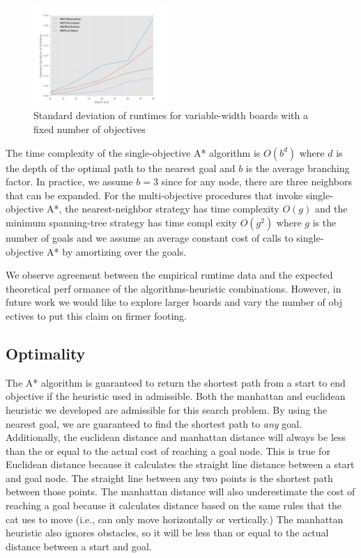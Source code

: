 \documentclass[12pt, conference, compsocconf]{IEEEtran}
\begin{document}
\begin{figure}[h!]
    \centering
    \includegraphics[width=0.45\textwidth]{variability.png}
    \caption{Standard deviation of runtimes for variable-width boards with a fixed number of objectives}
    \label{variability-fig}
\end{figure}

The time complexity of the single-objective A* algorithm is $O(b^d)$ where $d$
is the depth of the optimal path to the nearest goal and $b$ is the average
branching factor.  In practice, we assume $b = 3$ since for any node, there are
three neighbors that can be expanded.  For the multi-objective procedures that
invoke single-objective A*, the nearest-neighbor strategy has time complexity
$O(g)$ and the minimum spanning-tree strategy has time compl exity $O(g^2)$
where $g$ is the number of goals and we assume an average constant cost of
calls to single-objective A* by amortizing over the goals.

We observe agreement between the empirical runtime data and the expected
theoretical perf ormance of the algorithms-heuristic combinations.  However, in
future work we would like to explore larger boards and vary the number of obj
ectives to put this claim on firmer footing.


\subsection{Optimality}
The A* algorithm is guaranteed to return the shortest path from a start to end
objective if the heuristic used in admissible.  Both the manhattan and
euclidean heuristic we developed are admissible for this search problem.  By
using the nearest goal, we are guaranteed to find the shortest path to {\em
any} goal.  Additionally, the euclidean distance and manhattan distance will
always be less than the or equal to the actual cost of reaching a goal node.
This is true for Euclidean distance because it calculates the straight line
distance between a start and goal node.  The straight line between any two
points is the shortest path between those points.  The manhattan distance will
also underestimate the cost of reaching a goal because it calculates distance
based on the same rules that the cat ues to move (i.e., can only move
horizontally or vertically.)  The manhattan heuristic also ignores obstacles,
so it will be less than or equal to the actual distance between a start and
goal.
\end{document}
